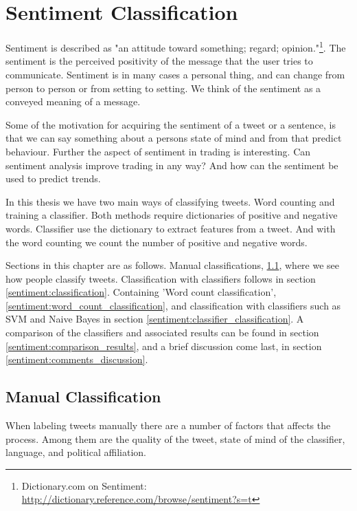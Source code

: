 \chapter{Sentiment Classification}\label{sentiment}
Sentiment is described as "an attitude toward something; regard;
opinion."\footnote{ Dictionary.com on Sentiment:
\url{http://dictionary.reference.com/browse/sentiment?s=t}}. The sentiment is the perceived positivity of the message that the user tries to
communicate. Sentiment is in many cases a personal thing, and can change from
person to person or from setting to setting. We think of the sentiment as a
conveyed meaning of a message. 

Some of the motivation for acquiring the sentiment of a tweet or a sentence, is
that we can say something about a persons state of mind and from that predict
behaviour. Further the aspect of sentiment in trading is interesting. Can
sentiment analysis improve trading in any way? And how can the sentiment be used
to predict trends.

In this thesis we have two main ways of classifying tweets. Word counting and
training a classifier. Both methods require dictionaries of positive and
negative words. Classifier use the dictionary
to extract features from a tweet. And with the word counting we count the
number of positive and negative words. 

Sections in this chapter are as follows. Manual classifications,
\ref{sentiment:manual_classification}, where we see how people classify
tweets. Classification with classifiers follows in section
\ref{sentiment:classification}. Containing 'Word count classification',
\ref{sentiment:word_count_classification}, and classification with classifiers
such as SVM and Naive Bayes in section
\ref{sentiment:classifier_classification}. A comparison of the classifiers and
associated results can be found in section \ref{sentiment:comparison_results},
and a brief discussion come last, in section
\ref{sentiment:comments_discussion}.
%

\section{Manual Classification}\label{sentiment:manual_classification}
When labeling tweets manually there are a number of factors that affects the
process. Among them are the quality of the tweet, state of mind of the
classifier, language, and political affiliation.

